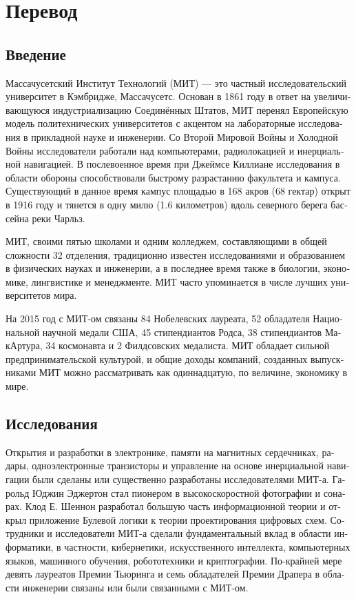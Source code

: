 \section{Перевод}

\begin{russian}

  \subsection{Введение}


Массачусетский Институт Технологий (МИТ) --- это частный исследовательский университет в Кэмбридже, Массачусетс. Основан в 1861 году в ответ на увеличивающуюся индустриализацию Соединённых Штатов, МИТ перенял Европейскую модель политехнических университетов с акцентом на лабораторные исследования в прикладной науке и инженерии. Со Второй Мировой Войны и Холодной Войны исследователи работали над компьютерами, радиолокацией и инерциальной навигацией. В послевоенное время при Джеймсе Киллиане исследования в области обороны способствовали быстрому разрастанию факультета и кампуса. Существующий в данное время кампус площадью в 168 акров (68 гектар) открыт в 1916 году и тянется в одну милю (1.6 километров) вдоль северного берега бассейна реки Чарльз.

МИТ, своими пятью школами и одним колледжем, составляющими в общей сложности 32 отделения, традиционно известен исследованиями и образованием в физических науках и инженерии, а в последнее время также в биологии, экономике, лингвистике и менеджменте. МИТ часто упоминается в числе лучших университетов мира.

На 2015 год с МИТ-ом связаны 84 Нобелевских лауреата, 52 обладателя Национальной научной медали США, 45 стипендиантов Родса, 38 стипендиантов МакАртура, 34 космонавта и 2 Филдсовских медалиста. МИТ обладает сильной предпринимательской культурой, и общие доходы компаний, созданных выпускниками МИТ можно рассматривать как одиннадцатую, по величине, экономику в мире.

\subsection {Исследования}

Открытия и разработки в электронике, памяти на магнитных сердечниках, радары, одноэлектронные транзисторы и управление на основе инерциальной навигации были сделаны или существенно разработаны исследователями МИТ-а. Гарольд Юджин Эджертон стал пионером в высокоскоростной фотографии и сонарах. Клод Е. Шеннон разработал большую часть информационной теории и открыл приложение Булевой логики к теории проектирования цифровых схем. Сотрудники и исследователи МИТ-а сделали фундаментальный вклад в области информатики, в частности, кибернетики, искусственного интеллекта, компьютерных языков, машинного обучения, робототехники и криптографии. По-крайней мере девять лауреатов Премии Тьюринга и семь обладателей Премии Драпера в области инженерии связаны или были связанными с МИТ-ом.


\end{russian}
